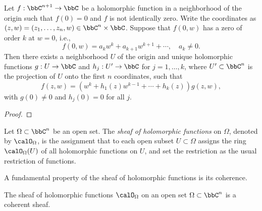     \begin{theorem}\label{thm:Weierstrass_Preparation_Theorem}
        Let \(f: \bbC^{n+1} \to \bbC\) be a holomorphic function in a neighborhood of the origin such that \(f(0) = 0\) and \(f\) is not identically zero. 
        Write the coordinates as \((z,w) = (z_1, \ldots, z_n, w) \in \bbC^{n} \times \bbC\).
        Suppose that \(f(0,w)\) has a zero of order \(k\) at \(w = 0\), i.e.,
        \[ f(0,w) = a_k w^k + a_{k+1} w^{k+1} + \cdots, \quad a_k \neq 0. \]
        Then there exists a neighborhood \(U\) of the origin and unique holomorphic functions \(g: U \to \bbC\) and \(h_j: U' \to \bbC\) for \(j = 1, \ldots, k\), where \(U' \subset \bbC^n\) is the projection of \(U\) onto the first \(n\) coordinates, such that
        \[ f(z,w) = (w^k + h_1(z) w^{k-1} + \cdots + h_k(z)) g(z,w), \]
        with \(g(0) \neq 0\) and \(h_j(0) = 0\) for all \(j\).
    \end{theorem}
    \begin{proof}
    \end{proof}


    \begin{definition}\label{def:sheaf_of_holomorphic_functions}
        Let \(\Omega \subset \bbC^n\) be an open set. 
        The \emph{sheaf of holomorphic functions} on \(\Omega\), denoted by \(\calO_\Omega\), 
        is the assignment that to each open subset \(U \subset \Omega\) assigns the ring \(\calO_\Omega(U)\) of all holomorphic functions on \(U\), 
        and set the restriction as the usual restriction of functions.
    \end{definition}

    A fundamental property of the sheaf of holomorphic functions is its coherence.

    \begin{theorem}\label{thm:Oka_Coherence_Theorem}
        The sheaf of holomorphic functions \(\calO_\Omega\) on an open set \(\Omega \subset \bbC^n\) is a coherent sheaf.
    \end{theorem}

